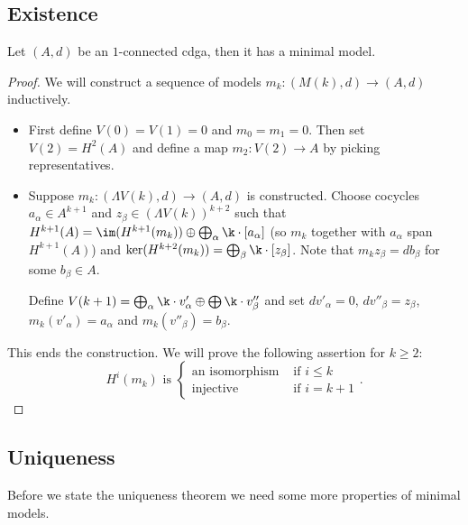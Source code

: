 \subsection{Existence}

\begin{theorem}
	Let $(A, d)$ be an $1$-connected cdga, then it has a minimal model.
\end{theorem}
\begin{proof}
	We will construct a sequence of models $m_k: (M(k), d) \to (A, d)$ inductively.
	\begin{itemize}
		\item First define $V(0) = V(1) = 0$ and $m_0 = m_1 = 0$. Then set $V(2) = H^2(A)$ and define a map $m_2: V(2) \to A$ by picking representatives.
		\item Suppose $m_k: (\Lambda V(k), d) \to (A, d)$ is constructed. Choose cocycles $a_\alpha \in A^{k+1}$ and $z_\beta \in (\Lambda V(k))^{k+2}$ such that $H^{k+1}(A) = \im(H^{k+1}(m_k)) \oplus \bigoplus_\alpha \k \cdot [a_\alpha]$ (so $m_k$ together with $a_\alpha$ span $H^{k+1}(A)$) and $\ker(H^{k+2}(m_k)) = \bigoplus_\beta \k \cdot [z_\beta]$. Note that $m_k z_\beta = db_\beta$ for some $b_\beta \in A$.

		Define $V(k+1) = \bigoplus_\alpha \k \cdot v'_\alpha \oplus \bigoplus \k \cdot v''_\beta$ and set $dv'_\alpha = 0$, $dv''_\beta = z_\beta$, $m_k(v'_\alpha) = a_\alpha$ and $m_k(v''_\beta) = b_\beta$.
	\end{itemize}
	This ends the construction. We will prove the following assertion for $k \geq 2$:
	$$ H^i(m_k) \text{ is } \begin{cases}
		\text{an isomorphism} &\text{ if } i \leq k \\
		\text{injective}      &\text{ if } i = k + 1
	\end{cases}. $$
\end{proof}


\subsection{Uniqueness}

Before we state the uniqueness theorem we need some more properties of minimal models.

